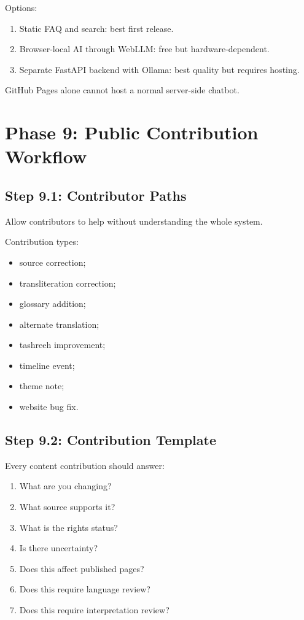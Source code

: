 \documentclass[11pt]{article}
\begin{document}
Options:

\begin{enumerate}
  \item Static FAQ and search: best first release.
  \item Browser-local AI through WebLLM: free but hardware-dependent.
  \item Separate FastAPI backend with Ollama: best quality but requires hosting.
\end{enumerate}

GitHub Pages alone cannot host a normal server-side chatbot.

\section{Phase 9: Public Contribution Workflow}

\subsection{Step 9.1: Contributor Paths}

Allow contributors to help without understanding the whole system.

Contribution types:

\begin{itemize}
  \item source correction;
  \item transliteration correction;
  \item glossary addition;
  \item alternate translation;
  \item tashreeh improvement;
  \item timeline event;
  \item theme note;
  \item website bug fix.
\end{itemize}

\subsection{Step 9.2: Contribution Template}

Every content contribution should answer:

\begin{enumerate}
  \item What are you changing?
  \item What source supports it?
  \item What is the rights status?
  \item Is there uncertainty?
  \item Does this affect published pages?
  \item Does this require language review?
  \item Does this require interpretation review?
\end{enumerate}
\end{document}

